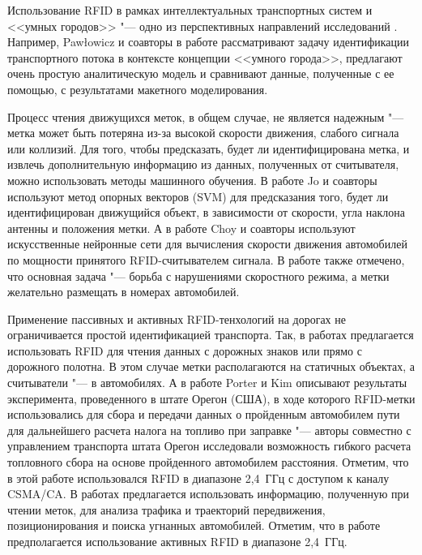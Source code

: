 Использование RFID в рамках интеллектуальных транспортных систем и <<умных городов>> "--- одно из перспективных направлений исследований \cite{Pawowicz2020, Pandit2009, Sundar2015}. Например, Pawłowicz и соавторы в работе \cite{Pawowicz2020} рассматривают задачу идентификации транспортного потока в контексте концепции <<умного города>>, предлагают очень простую аналитическую модель и сравнивают данные, полученные с ее помощью, с результатами макетного моделирования.

Процесс чтения движущихся меток, в общем случае, не является надежным "--- метка может быть потеряна из-за высокой скорости движения, слабого сигнала или коллизий. Для того, чтобы предсказать, будет ли идентифицирована метка, и извлечь дополнительную информацию из данных, полученных от считывателя, можно использовать методы машинного обучения. В работе \cite{Jo2009} Jo и соавторы используют метод опорных векторов (SVM) для предсказания того, будет ли идентифицирован движущийся объект, в зависимости от скорости, угла наклона антенны и положения метки. А в работе \cite{Choy2020} Choy и соавторы используют искусственные нейронные сети для вычисления скорости движения автомобилей по мощности принятого RFID-считывателем сигнала. В работе также отмечено, что основная задача "--- борьба с нарушениями скоростного режима, а метки желательно размещать в номерах автомобилей.

Применение пассивных и активных RFID-тенхологий на дорогах не ограничивается простой идентификацией транспорта. Так, в работах \cite{GarciaOya2018, Jing2016, Hidalgo2013, Jing2013, Cheng2012, Perez2010} предлагается использовать RFID для чтения данных с дорожных знаков или прямо с дорожного полотна. В этом случае метки располагаются на статичных объектах, а считыватели "--- в автомобилях. А в работе \cite{Porter2008} Porter и Kim описывают результаты эксперимента, проведенного в штате Орегон (США), в ходе которого RFID-метки использовались для сбора и передачи данных о пройденным автомобилем пути для дальнейшего расчета налога на топливо при заправке "--- авторы совместно с управлением транспорта штата Орегон исследовали возможность гибкого расчета топловного сбора на основе пройденного автомобилем расстояния. Отметим, что в этой работе использовался RFID в диапазоне 2,4~ГГц с доступом к каналу CSMA/CA. В работах \cite{Zheng2020, HongziZhu2009, Pandit2009} предлагается использовать информацию, полученную при чтении меток, для анализа трафика и траекторий передвижения, позиционирования и поиска угнанных автомобилей. Отметим, что в работе \cite{HongziZhu2009} предполагается использование активных RFID в диапазоне 2,4~ГГц.

